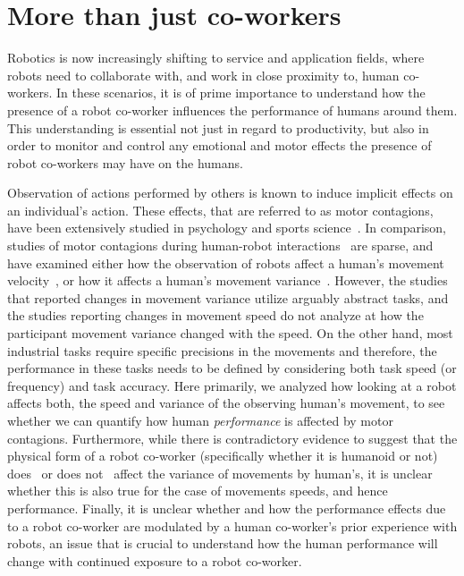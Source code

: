 \chapter{More than just co-workers}

Robotics is now increasingly shifting to service and application fields, where robots need to collaborate with, and work in close proximity to, human co-workers. In these scenarios, it is of prime importance to understand how the presence of a robot co-worker influences the performance of humans around them. This understanding is essential not just in regard to productivity, but also in order to monitor and control any emotional and motor effects the presence of robot co-workers may have on the humans.

Observation of actions performed by others is known to induce implicit effects on an individual's action. These effects, that are referred to as motor contagions, have been extensively studied in psychology and sports science~\cite{Heyes:PB:2011,Blakemore:Neuropsychologia:2005,Becchio:BJN:2007,Ganesh:Springer:2015,Ikegami:SciReport:2014,Hillebrandt:SciReports:2014,Chaminade:BRB:2008,Oztop:RAS_ICHR:2004,Kilner:CurBio:2003,Sciutti:IJSR:2012}. In comparison, studies of motor contagions during human-robot interactions~\cite{Vasalya:roman:2018} are sparse, and have examined either how the observation of robots affect a human's movement velocity~\cite{Noy:B&C:2009,Kilner:SocialNeuro:2007,Bisio:PlosOne:2010,Bisio:PlosOne:2014}, or how it affects a human's movement variance~\cite{Kupferberg:Methods:2009,Kupferberg:PlosOne:2012,Brass:ActaPsych:2001,Press:CBR:2005}. However, the studies that reported changes in movement variance utilize arguably abstract tasks, and the studies reporting changes in movement speed do not analyze at how the participant movement variance changed with the speed. On the other hand, most industrial tasks require specific precisions in the movements and therefore, the performance in these tasks needs to be defined by considering both task speed (or frequency) and task accuracy. Here primarily, we analyzed how looking at a robot affects both, the speed and variance of the observing human's movement, to see whether we can quantify how human \textit{performance} is affected by motor contagions.  
Furthermore, while there is contradictory evidence to suggest that the physical form of a robot co-worker (specifically whether it is humanoid or not) does~\cite{Chaminade:JPP:2009} or does not~\cite{Kupferberg:PlosOne:2012} affect the variance of movements by human's, it is unclear whether this is also true for the case of movements speeds, and hence performance. Finally, it is unclear whether and how the performance effects due to a robot co-worker are modulated by a human co-worker's prior experience with robots, an issue that is crucial to understand how the human performance will change with continued exposure to a robot co-worker.


